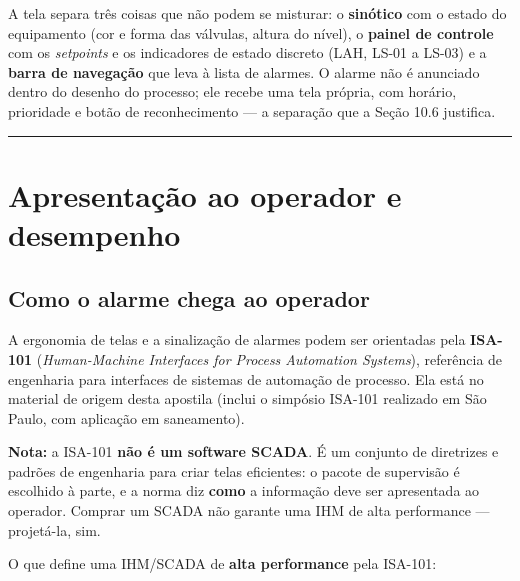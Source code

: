 A tela separa três coisas que não podem se misturar: o \textbf{sinótico} com o estado do equipamento
(cor e forma das válvulas, altura do nível), o \textbf{painel de controle} com os \emph{setpoints} e os
indicadores de estado discreto (LAH, LS-01 a LS-03) e a \textbf{barra de navegação} que leva à lista de
alarmes. O alarme não é anunciado dentro do desenho do processo; ele recebe uma tela própria, com
horário, prioridade e botão de reconhecimento --- a separação que a Seção 10.6 justifica.

\begin{center}\rule{0.5\linewidth}{0.5pt}\end{center}

\section{Apresentação ao operador e desempenho}\label{apresentauxe7uxe3o-ao-operador-e-desempenho}

\subsection{Como o alarme chega ao operador}\label{como-o-alarme-chega-ao-operador}

A ergonomia de telas e a sinalização de alarmes podem ser orientadas pela \textbf{ISA-101} (\emph{Human-Machine Interfaces for Process Automation Systems}), referência de engenharia para interfaces de sistemas de automação de processo. Ela está no material de origem desta apostila (inclui o simpósio ISA-101 realizado em São Paulo, com aplicação em saneamento).

\begin{caixanota}

\textbf{Nota:} a ISA-101 \textbf{não é um software SCADA}. É um conjunto de diretrizes e padrões de engenharia para criar telas eficientes: o pacote de supervisão é escolhido à parte, e a norma diz \textbf{como} a informação deve ser apresentada ao operador. Comprar um SCADA não garante uma IHM de alta performance --- projetá-la, sim.

\end{caixanota}

O que define uma IHM/SCADA de \textbf{alta performance} pela ISA-101:

